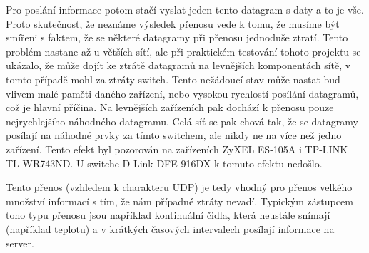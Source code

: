 Pro poslání informace potom stačí vyslat jeden tento datagram s daty a to je vše. Proto skutečnost, že neznáme výsledek přenosu vede k tomu, že musíme být smířeni s faktem, že se některé datagramy při přenosu jednoduše ztratí. Tento problém nastane až u větších sítí, ale při praktickém testování tohoto projektu se ukázalo, že může dojít ke ztrátě datagramů na levnějších komponentách sítě, v tomto případě mohl za ztráty switch. Tento nežádoucí stav může nastat buď vlivem malé paměti daného zařízení, nebo vysokou rychlostí posílání datagramů, což je hlavní příčina. Na levnějších zařízeních pak dochází k přenosu pouze nejrychlejšího náhodného datagramu. Celá síť se pak chová tak, že se datagramy posílají na náhodné prvky za tímto switchem, ale nikdy ne na více než jedno zařízení. Tento efekt byl pozorován na zařízeních ZyXEL ES-105A i TP-LINK TL-WR743ND. U switche D-Link DFE-916DX k tomuto efektu nedošlo.

Tento přenos (vzhledem k charakteru UDP) je tedy vhodný pro přenos velkého množství informací s tím, že nám případné ztráty nevadí. Typickým zástupcem toho typu přenosu jsou například kontinuální čidla, která neustále snímají (například teplotu) a v krátkých časových intervalech posílají informace na server.